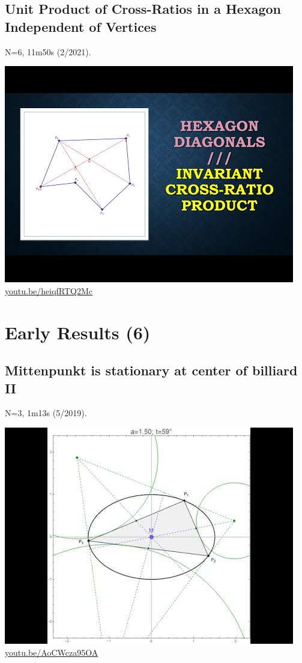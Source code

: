 \documentclass[12pt]{amsart}
\begin{document}
\subsection{Unit Product of Cross-Ratios in a Hexagon Independent of Vertices}
\label{vid:heiqfRTQ2Mc}
\noindent N=6, 11m50s (2/2021). 
\begin{center}\includegraphics[width=.5\textwidth]{pics/heiqfRTQ2Mc.jpg} \\ 
\href{https://youtu.be/heiqfRTQ2Mc}{\url{youtu.be/heiqfRTQ2Mc}}\end{center}
% 


\section{Early Results (6)}

\subsection{Mittenpunkt is stationary at center of billiard II}
\label{vid:AoCWcza95OA}
\noindent N=3, 1m13s (5/2019). 
\begin{center}\includegraphics[width=.5\textwidth]{pics/AoCWcza95OA.jpg} \\ 
\href{https://youtu.be/AoCWcza95OA}{\url{youtu.be/AoCWcza95OA}}\end{center}
% 
\end{document}
